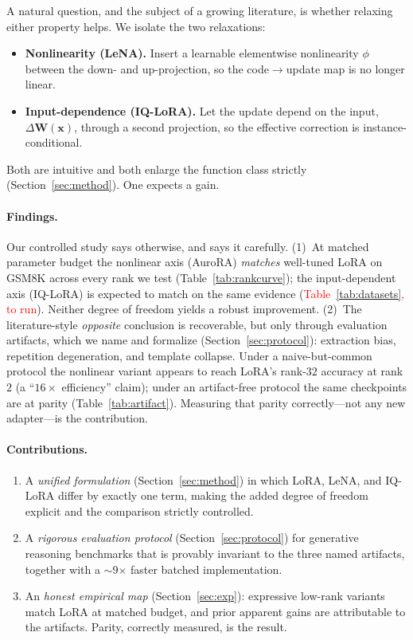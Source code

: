 \documentclass[preprint,11pt]{elsarticle}
\newcommand{\x}{\bm{x}}
\newcommand{\W}{\bm{W}}
\begin{document}
A natural question, and the subject of a growing literature, is whether relaxing either property helps. We isolate the two
relaxations:
\begin{itemize}
\item \textbf{Nonlinearity (LeNA).} Insert a learnable elementwise nonlinearity $\phi$ between the down- and up-projection,
so the code$\to$update map is no longer linear.
\item \textbf{Input-dependence (IQ-LoRA).} Let the update depend on the input, $\Delta\W(\x)$, through a second projection,
so the effective correction is instance-conditional.
\end{itemize}
Both are intuitive and both enlarge the function class strictly (Section~\ref{sec:method}). One expects a gain.

\paragraph{Findings.} Our controlled study says otherwise, and says it carefully.
(1)~At matched parameter budget the nonlinear axis (AuroRA) \emph{matches} well-tuned LoRA on GSM8K across every rank we
test (Table~\ref{tab:rankcurve}); the input-dependent axis (IQ-LoRA) is expected to match on the same evidence
(\textcolor{red}{Table~\ref{tab:datasets}, to run}). Neither degree of freedom yields a robust improvement.
(2)~The literature-style \emph{opposite} conclusion is recoverable, but only through evaluation artifacts, which we name
and formalize (Section~\ref{sec:protocol}): extraction bias, repetition degeneration, and template collapse. Under a
naive-but-common protocol the nonlinear variant appears to reach LoRA's rank-$32$ accuracy at rank $2$
(a ``$16\times$ efficiency'' claim); under an artifact-free protocol the same checkpoints are at parity
(Table~\ref{tab:artifact}). Measuring that parity correctly---not any new adapter---is the contribution.

\paragraph{Contributions.}
\begin{enumerate}
\item A \emph{unified formulation} (Section~\ref{sec:method}) in which LoRA, LeNA, and IQ-LoRA differ by exactly one term,
making the added degree of freedom explicit and the comparison strictly controlled.
\item A \emph{rigorous evaluation protocol} (Section~\ref{sec:protocol}) for generative reasoning benchmarks that is
provably invariant to the three named artifacts, together with a $\sim$9$\times$ faster batched implementation.
\item An \emph{honest empirical map} (Section~\ref{sec:exp}): expressive low-rank variants match LoRA at matched budget,
and prior apparent gains are attributable to the artifacts. Parity, correctly measured, is the result.
\end{enumerate}
\end{document}
